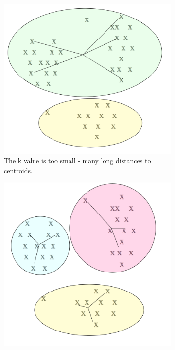 \begin{figure}[b]
        \centering
        \begin{subfigure}[t]{0.30\textwidth}
                \includegraphics[width=\textwidth]{Figures/underfitting}
                \caption{The k value is too small - many long distances to centroids.}
                \label{fig:underfitting}
        \end{subfigure}%
        \begin{subfigure}[t]{0.30\textwidth}
                \includegraphics[width=\textwidth]{Figures/justright}

\end{subfigure}
\end{figure}
